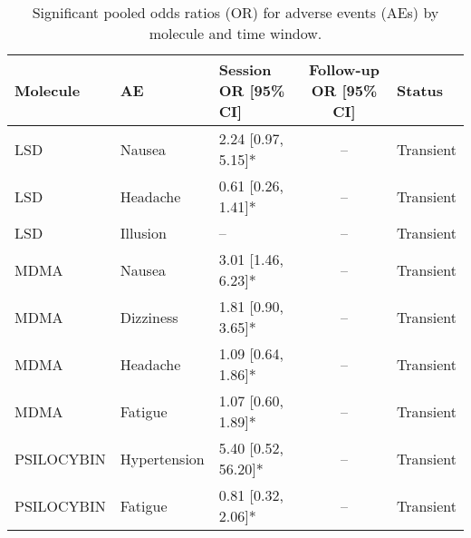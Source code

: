 \begin{table}[htbp]
  \centering
  \caption{Significant pooled odds ratios (OR) for adverse events (AEs) by molecule and time window.}
  \label{tab:forest-ae-by-window}
  \begin{tabular}{lllcl}
    \toprule
    Molecule & AE & Session OR [95\% CI] & Follow-up OR [95\% CI] & Status \\
    \midrule
    LSD & Nausea & 2.24 [0.97, 5.15]* & -- & Transient \\
    LSD & Headache & 0.61 [0.26, 1.41]* & -- & Transient \\
    LSD & Illusion & -- & -- & Transient \\
    MDMA & Nausea & 3.01 [1.46, 6.23]* & -- & Transient \\
    MDMA & Dizziness & 1.81 [0.90, 3.65]* & -- & Transient \\
    MDMA & Headache & 1.09 [0.64, 1.86]* & -- & Transient \\
    MDMA & Fatigue & 1.07 [0.60, 1.89]* & -- & Transient \\
    PSILOCYBIN & Hypertension & 5.40 [0.52, 56.20]* & -- & Transient \\
    PSILOCYBIN & Fatigue & 0.81 [0.32, 2.06]* & -- & Transient \\
    \bottomrule
  \end{tabular}
\end{table}

